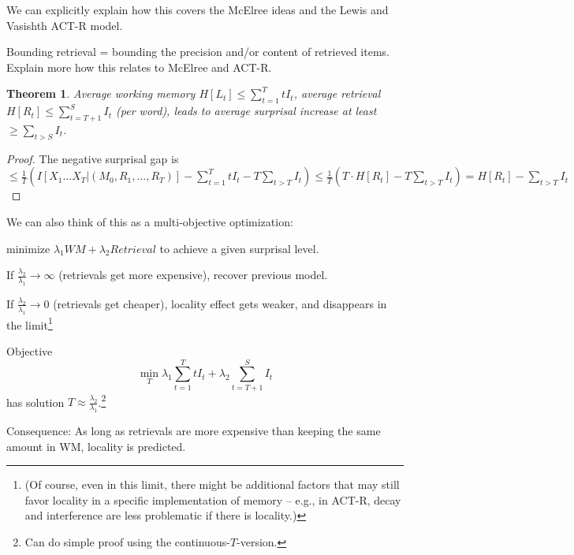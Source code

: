 \documentclass[11pt,letterpaper]{article}
\newcounter{theorem}
\newtheorem{thm}[theorem]{Theorem}
\begin{document}
We can explicitly explain how this covers the McElree ideas and the Lewis and Vasishth ACT-R model.

Bounding retrieval = bounding the precision and/or content of retrieved items. Explain more how this relates to McElree and ACT-R.

\begin{thm}
Average working memory $H[L_t] \leq \sum_{t=1}^T t I_t$, average retrieval $H[R_t] \leq \sum_{t=T+1}^S I_t$ (per word), leads to average surprisal increase at least $\geq \sum_{t>S} I_t$.
\end{thm}

\begin{proof}
The negative surprisal gap is
$\leq \frac{1}{T}(I[X_1\dots X_T|(M_0, R_1, ..., R_T)] - \sum_{t=1}^T t I_t - T \sum_{t>T} I_t) \leq  \frac{1}{T}(T\cdot H[R_t] - T \sum_{t>T} I_t) = H[R_t] - \sum_{t>T} I_t$

\end{proof}



We can also think of this as a multi-objective optimization:

minimize $\lambda_1 WM + \lambda_2 Retrieval$ to achieve a given surprisal level.

If $\frac{\lambda_2}{\lambda_1} \rightarrow \infty$ (retrievals get more expensive), recover previous model.

If $\frac{\lambda_2}{\lambda_1} \rightarrow 0$ (retrievals get cheaper), locality effect gets weaker, and disappears in the limit\footnote{(Of course, even in this limit, there might be additional factors that may still favor locality in a specific implementation of memory -- e.g., in ACT-R, decay and interference are less problematic if there is locality.)}

Objective
$$\min_{T} \lambda_1 \sum_{t=1}^T t I_t + \lambda_2 \sum_{t=T+1}^S I_t$$
has solution $T \approx \frac{\lambda_2}{\lambda_1}$.\footnote{Can do simple proof using the continuous-$T$-version.}


Consequence: As long as retrievals are more expensive than keeping the same amount in WM, locality is predicted.
\end{document}
